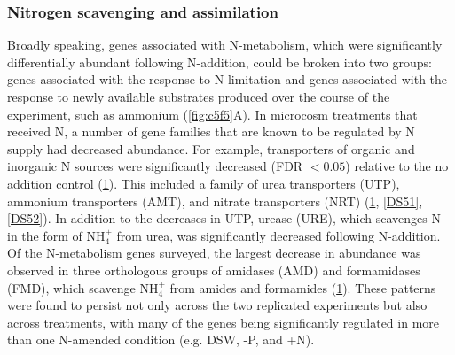 \begin{figure}[p!]
  \label{fig:c5f4}
\end{figure}

\subsubsection{Nitrogen scavenging and assimilation}

Broadly speaking, genes associated with N-metabolism, which were significantly differentially abundant following N-addition, could be broken into two groups: genes associated with the response to N-limitation and genes associated with the response to newly available substrates produced over the course of the experiment, such as ammonium (\cref{fig:c5f5}A). In microcosm treatments that received N, a number of gene families that are known to be regulated by N supply had decreased abundance.  For example, transporters of organic and inorganic N sources were significantly decreased (FDR $< 0.05$) relative to the no addition control (\cref{fig:c5f4}). This included a family of urea transporters (UTP), ammonium transporters (AMT), and nitrate transporters (NRT) (\cref{fig:c5f4}, \ref{DS51}, \ref{DS52}). In addition to the decreases in UTP, urease (URE), which scavenges N in the form of NH$_{4}^+$ from urea, was significantly decreased following N-addition. Of the N-metabolism genes surveyed, the largest decrease in abundance was observed in three orthologous groups of amidases (AMD) and formamidases (FMD), which scavenge NH$_{4}^+$ from amides and formamides (\cref{fig:c5f4}). These patterns were found to persist not only across the two replicated experiments but also across treatments, with many of the genes being significantly regulated in more than one N-amended condition (e.g. DSW, -P, and +N). \par

